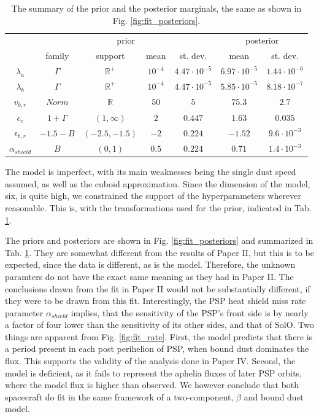 \begin{table}[t]
\caption{The summary of the prior and the posterior marginals, the same as shown in Fig. \ref{fig:fit_posteriors}.}
\centering
\label{tab:prior_posterior}
\begin{tabular}{c|cccc|cc}
\multicolumn{1}{p{1.2cm}}{  } \vline & \multicolumn{4}{c}{prior} \vline & \multicolumn{2}{c}{posterior} \\ 
& family & support & mean & st. dev. &  mean & st. dev. \\
\hline
$\lambda_a$ & $\Gamma$ & $\mathbb{R}^+$ & $10^{-4}$ & $4.47 \cdot 10^{-5}$ & 
$6.97 \cdot 10^{-5}$ & $1.44 \cdot 10^{-6}$  \\
$\lambda_b$ & $\Gamma$ & $\mathbb{R}^+$ & $10^{-4}$ & $4.47 \cdot 10^{-5}$ & 
$5.85 \cdot 10^{-5}$ & $8.18 \cdot 10^{-7}$  \\
$v_{b,r}$ & $Norm$ & $\mathbb{R}$ & $50$ & $5$ & 
$75.3$ & $2.7$  \\
$\epsilon_v$ & $1+\Gamma$ & $(1,\infty)$ & $2$ & $0.447$ & 
$1.63$ & $0.035$  \\
$\epsilon_{b,r}$ & $-1.5-B$ & $(-2.5,-1.5)$ & $-2$ & $0.224$ & 
$-1.52$ & $9.6 \cdot 10^{-3}$  \\
$\alpha_{shield}$ & $B$ & $(0,1)$ & $0.5$ & $0.224$ & 
$0.71$ & $1.4 \cdot 10^{-3}$  \\
\hline
\end{tabular}
\end{table}

The model is imperfect, with its main weaknesses being the single dust speed assumed, as well as the cuboid approximation. Since the dimension of the model, six, is quite high, we constrained the support of the hyperparameters wherever reasonable. This is, with the transformations used for the prior, indicated in Tab. \ref{tab:prior_posterior}.

The priors and posteriors are shown in Fig. \ref{fig:fit_posteriors} and summarized in Tab. \ref{tab:prior_posterior}. They are somewhat different from the results of Paper II, but this is to be expected, since the data is different, as is the model. Therefore, the unknown paramters do not have the exact same meaning as they had in Paper II. The conclusions drawn from the fit in Paper II would not be substantially different, if they were to be drawn from this fit. Interestingly, the PSP heat shield miss rate parameter $\alpha_{shield}$ implies, that the sensitivity of the PSP's front side is by nearly a factor of four lower than the sensitivity of its other sides, and that of SolO. Two things are apparent from Fig. \ref{fig:fit_rate}. First, the model predicts that there is a period present in each post perihelion of PSP, when bound dust dominates the flux. This supports the validity of the analysis done in Paper IV. Second, the model is deficient, as it fails to represent the aphelia fluxes of later PSP orbits, where the model flux is higher than observed. We however conclude that both spacecraft do fit in the same framework of a two-component, $\beta$ and bound dust model. 

